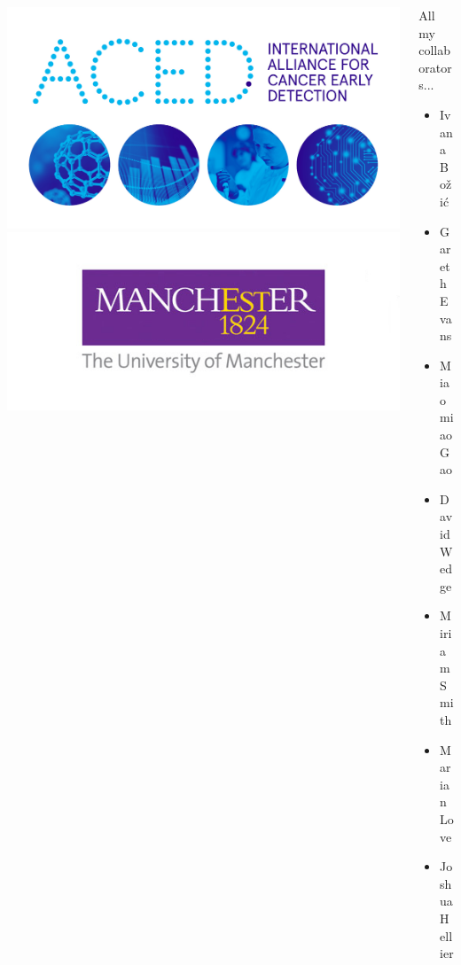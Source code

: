 \documentclass{beamer}
\begin{document}
\begin{frame}
\begin{columns}
\begin{column}{0.5\textwidth}
        \begin{center}
        \includegraphics[width=\textwidth]{figures/aced_website_header.jpg}
        \includegraphics[width=\textwidth]{figures/logo_big.jpg}
        \end{center}

        \end{column}
        \begin{column}{0.5\textwidth}
        All my collaborators...

        \begin{itemize}
            \item Ivana Bo\v{z}i\'{c}
            \item Gareth Evans
            \item Miaomiao Gao
            \item David Wedge
            \item Miriam Smith
            \item Marian Love
            \item Joshua Hellier
        \end{itemize}

        \end{column}
    \end{columns}
\end{frame}
\end{document}
